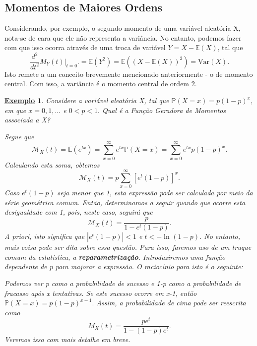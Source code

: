 \documentclass{article}
\newtheorem{example}{\underline{Exemplo}}
\begin{document}
\subsection{Momentos de Maiores Ordens}
Considerando, por exemplo, o segundo momento de uma variável aleatória X,
nota-se de cara que ele não representa a variância. No entanto, podemos fazer com que isso ocorra
através de uma troca de variável \(Y = X - \mathbb{E}(X)\), tal que 
\[
  \frac{d^{2}}{dt^{2}}M_{Y}(t)\biggl|_{t=0}^{}\biggr. = \mathbb{E}(Y^{2}) = \mathbb{E}((X-\mathbb{E}(X))^{2}) = \mathrm{Var}(X).
\]
Isto remete a um conceito brevemente mencionado anteriormente - o de momento central. Com isso, a variância é o momento
central de ordem 2.
\begin{example}
  Considere a variável aleatória X, tal que \(\mathbb{P}(X=x) = p(1-p)^{x},\) em que \(x=0,1,\dotsc\) e \(0 < p < 1.\)
  Qual é a Função Geradora de Momentos associada a X?

  Segue que 
  \[
    \mathcal{M}_{X}(t) = \mathbb{E}(e^{tx}) = \sum\limits_{x=0}^{\infty}e^{tx}\mathbb{P}(X=x) = \sum\limits_{x=0}^{\infty}e^{tx}p(1-p)^{x}.
  \]
  Calculando esta soma, obtemos 
  \[
    \mathcal{M}_{X}(t) = p\sum\limits_{x=0}^{\infty}[e^{t}(1-p)]^{x}.
  \]
  Caso \(e^{t}(1-p)\) seja menor que 1, esta expressão pode ser calculada por meio da série geométrica comum.
  Então, determinamos a seguir quando que ocorre esta desigualdade com 1, pois, neste caso, seguirá que 
  \[
    \mathcal{M}_{X}(t) = \frac{p}{1-e^{t}(1-p)}.
  \]
  A priori, isto significa que \(|e^{t}(1-p)| < 1\) e \(t < -\ln^{}{(1-p)}\). No entanto, mais coisa pode ser dita 
  sobre essa questão. Para isso, faremos uso de um truque comum da estatística, a \textbf{reparametrização}. Introduziremos uma função dependente de p para majorar a expressão.
  O raciocínio para isto é o seguinte: 

  Podemos ver p como a probabilidade de sucesso e 1-p como a probabilidade de fracasso após x tentativas. Se
  este sucesso ocorre em x-1, então \(\mathbb{P}(X=x) = p(1-p)^{x-1}.\) Assim, a probabilidade de cima pode ser reescrita como 
  \[
    M_{X}(t) = \frac{pe^{t}}{1-(1-p)e^{t}}.
  \]
  Veremos isso com mais detalhe em breve.
\end{example}
\end{document}
